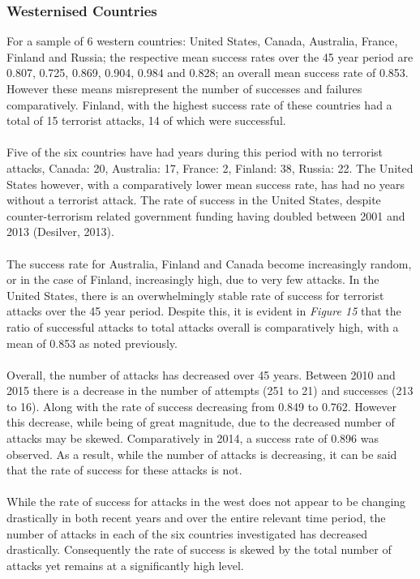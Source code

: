 \documentclass[10pt,a4paper]{article}
\begin{document}
\subsubsection{Westernised Countries}
For a sample of 6 western countries: United States, Canada, Australia, France, Finland and Russia; the respective mean success rates over the 45 year period are 0.807, 0.725, 0.869, 0.904, 0.984 and 0.828; an overall mean success rate of 0.853. However these means misrepresent the number of successes and failures comparatively. Finland, with the highest success rate of these countries had a total of 15 terrorist attacks, 14 of which were successful. 
\\\\
Five of the six countries have had years during this period with no terrorist attacks, Canada: 20, Australia: 17, France: 2, Finland: 38, Russia: 22. The United States however, with a comparatively lower mean success rate, has had no years without a terrorist attack. The rate of success in the United States, despite counter-terrorism related government funding having doubled between 2001 and 2013 (Desilver, 2013).
\\\\
The success rate for Australia, Finland and Canada become increasingly random, or in the case of Finland, increasingly high, due to very few attacks. In the United States, there is an overwhelmingly stable rate of success for terrorist attacks over the 45 year period. Despite this, it is evident in \textit{Figure 15} that the ratio of successful attacks to total attacks overall is comparatively high, with a mean of 0.853 as noted previously.
\\\\
Overall, the number of attacks has decreased over 45 years. Between 2010 and 2015 there is a decrease in the number of attempts (251 to 21) and successes (213 to 16). Along with the rate of success decreasing from 0.849 to 0.762. However this decrease, while being of great magnitude, due to the decreased number of attacks may be skewed. Comparatively in 2014, a success rate of 0.896 was observed. As a result, while the number of attacks is decreasing, it can be said that the rate of success for these attacks is not.
\\\\
While the rate of success for attacks in the west does not appear to be changing drastically in both recent years and over the entire relevant time period, the number of attacks in each of the six countries investigated has decreased drastically. Consequently the rate of success is skewed by the total number of attacks yet remains at a significantly high level.
\end{document}
